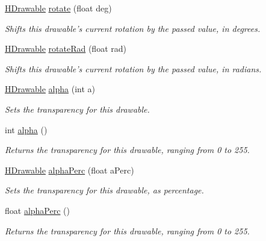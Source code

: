 \begin{DoxyCompactItemize}
\item 
\hyperlink{classhype_1_1core_1_1drawable_1_1_h_drawable}{H\-Drawable} \hyperlink{classhype_1_1core_1_1drawable_1_1_h_drawable_a70b50dc6d7d6f41db1581658cb01c0e1}{rotate} (float deg)
\begin{DoxyCompactList}\small\item\em Shifts this drawable's current rotation by the passed value, in degrees. \end{DoxyCompactList}\item 
\hyperlink{classhype_1_1core_1_1drawable_1_1_h_drawable}{H\-Drawable} \hyperlink{classhype_1_1core_1_1drawable_1_1_h_drawable_aea2c7f8c537f94274afe8219a8dd79bf}{rotate\-Rad} (float rad)
\begin{DoxyCompactList}\small\item\em Shifts this drawable's current rotation by the passed value, in radians. \end{DoxyCompactList}\item 
\hyperlink{classhype_1_1core_1_1drawable_1_1_h_drawable}{H\-Drawable} \hyperlink{classhype_1_1core_1_1drawable_1_1_h_drawable_ae0711e3bde7279c84b0282f928bbe699}{alpha} (int a)
\begin{DoxyCompactList}\small\item\em Sets the transparency for this drawable. \end{DoxyCompactList}\item 
int \hyperlink{classhype_1_1core_1_1drawable_1_1_h_drawable_ab3b43c250064df54b92a6939bddd0b43}{alpha} ()
\begin{DoxyCompactList}\small\item\em Returns the transparency for this drawable, ranging from 0 to 255. \end{DoxyCompactList}\item 
\hyperlink{classhype_1_1core_1_1drawable_1_1_h_drawable}{H\-Drawable} \hyperlink{classhype_1_1core_1_1drawable_1_1_h_drawable_a682fd36075ec97113d4b7f717705a2dc}{alpha\-Perc} (float a\-Perc)
\begin{DoxyCompactList}\small\item\em Sets the transparency for this drawable, as percentage. \end{DoxyCompactList}\item 
float \hyperlink{classhype_1_1core_1_1drawable_1_1_h_drawable_a40489fffc3b4e24a27ed8b1bfa38ca7d}{alpha\-Perc} ()
\begin{DoxyCompactList}\small\item\em Returns the transparency for this drawable, ranging from 0 to 255. \end{DoxyCompactList}\item 

\end{DoxyCompactItemize}
